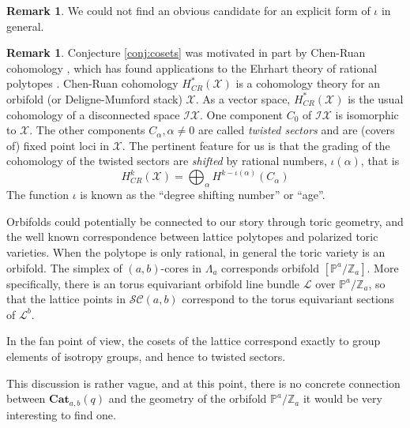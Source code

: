 \documentclass{amsart}[12pt]
\theoremstyle{definition}
\newtheorem{remark}[dummy]{Remark}
\newcommand{\Z}{\mathbb{Z}}
\newcommand{\proj}{\mathbb{P}}
\newcommand{\SC}{\mathcal{SC}}
\newcommand{\Cat}{\mathbf{Cat}}
\begin{document}
\begin{remark}
We could not find an obvious candidate for an explicit form of $\iota$ in general.


\end{remark}

\begin{remark}
Conjecture \ref{conj:cosets} was motivated in part by Chen-Ruan cohomology \cite{CR, ALR}, which has found applications to the Ehrhart theory of rational polytopes \cite{Stapledon}.  Chen-Ruan cohomology $H^*_{CR}(\mathcal{X})$ is a cohomology theory for an orbifold (or Deligne-Mumford stack) $\mathcal{X}$.   As a vector space, $H^*_{CR}(\mathcal{X})$ is the usual cohomology of a disconnected space $\mathcal{IX}$.  One component $C_0$ of $\mathcal{IX}$ is isomorphic to $\mathcal{X}$.  The other components $C_\alpha, \alpha\neq 0$ are called \emph{twisted sectors} and are (covers of) fixed point loci in $\mathcal{X}$.  The pertinent feature for us is that the grading of the cohomology of the twisted sectors are \emph{shifted} by rational numbers, $\iota(\alpha)$, that is
$$H^k_{CR}(\mathcal{X})=\bigoplus_{\alpha} H^{k-\iota(\alpha)}(C_\alpha)$$
The function $\iota$ is known as the ``degree shifting number'' or ``age''.


Orbifolds could potentially be connected to our story through toric geometry, and the well known correspondence between lattice polytopes and polarized toric varieties.  When the polytope is only rational, in general the toric variety is an orbifold. The simplex of $(a,b)$-cores in $\Lambda_a$ corresponds  orbifold $[\proj^a/\Z_a]$.  More specifically, there is an torus equivariant orbifold line bundle $\mathcal{L}$ over $\proj^a/\Z_a$, so that the lattice points in $\SC(a,b)$ correspond to the torus equivariant sections of $\mathcal{L}^b$.

In the fan point of view, the cosets of the lattice correspond exactly to group elements of isotropy groups, and hence to twisted sectors.  

This discussion is rather vague, and at this point, there is no concrete connection between $\Cat_{a,b}(q)$ and the geometry of the orbifold $\proj^a/\Z_a$ it would be very interesting to find one.

\end{remark}
\end{document}
